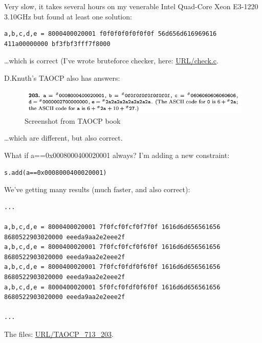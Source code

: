 

Very slow, it takes several hours on my venerable Intel Quad-Core Xeon E3-1220 3.10GHz but found at least one solution:

\begin{lstlisting}
a,b,c,d,e = 8000400020001 f0f0f0f0f0f0f0f 56d656d616969616 411a00000000 bf3fbf3fff7f8000
\end{lstlisting}

\dots which is correct (I've wrote bruteforce checker, here: \url{URL/check.c}.

D.Knuth's TAOCP also has answers:

\begin{figure}[H]
\label{fig:pipe_shuffled}
\centering
\includegraphics[scale=0.5]{pgm_synth/TAOCP_713_203/203a.png}
\caption{Screenshot from TAOCP book}
\end{figure}

\dots which are different, but also correct.

What if a==0x0008000400020001 always?
I'm adding a new constraint:

\begin{lstlisting}
s.add(a==0x0008000400020001)
\end{lstlisting}

We've getting many results (much faster, and also correct):

\begin{lstlisting}
...

a,b,c,d,e = 8000400020001 7f0fcf0fcf0f7f0f 1616d6d656561656 8680522903020000 eeeda9aa2e2eee2f
a,b,c,d,e = 8000400020001 7f0fcf0fcf0f6f0f 1616d6d656561656 8680522903020000 eeeda9aa2e2eee2f
a,b,c,d,e = 8000400020001 7f0fcf0fdf0f6f0f 1616d6d656561656 8680522903020000 eeeda9aa2e2eee2f
a,b,c,d,e = 8000400020001 5f0fcf0fdf0f6f0f 1616d6d656561656 8680522903020000 eeeda9aa2e2eee2f

...
\end{lstlisting}

The files: \url{URL/TAOCP_713_203}.

